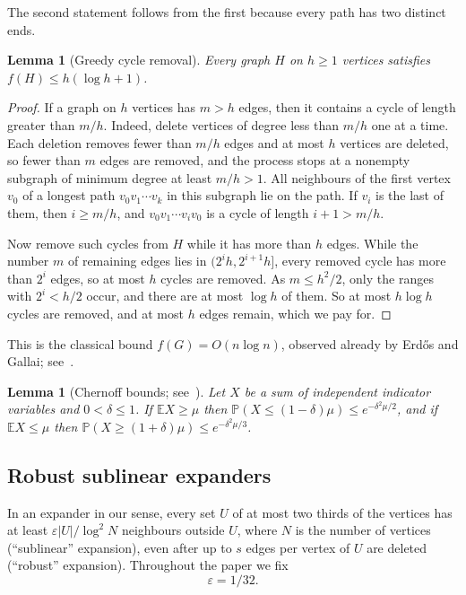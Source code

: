 \documentclass[11pt]{article}
\newtheorem{lemma}[theorem]{Lemma}
\theoremstyle{definition}
\theoremstyle{remark}
\numberwithin{equation}{section}
\numberwithin{figure}{section}
\numberwithin{table}{section}
\newcommand{\eps}{\varepsilon}
\newcommand{\E}{\mathbb{E}}
\renewcommand{\Pr}{\mathbb{P}}
\begin{document}
The second statement follows from the first because every path has two
distinct ends.

\begin{lemma}[Greedy cycle removal]\label{lem:egp}
Every graph $H$ on $h\ge1$ vertices satisfies $f(H)\le h(\log h+1)$.
\end{lemma}

\begin{proof}
If a graph on $h$ vertices has $m>h$ edges, then it contains a cycle of length
greater than $m/h$. Indeed, delete vertices of degree less than $m/h$ one at a
time. Each deletion removes fewer than $m/h$ edges and at most $h$ vertices are
deleted, so fewer than $m$ edges are removed, and the process stops at a
nonempty subgraph of minimum degree at least $m/h>1$. All neighbours of the
first vertex $v_0$ of a longest path $v_0v_1\cdots v_k$ in this subgraph lie on
the path. If $v_i$ is the last of them, then $i\ge m/h$, and
$v_0v_1\cdots v_iv_0$ is a cycle of length $i+1>m/h$.

Now remove such cycles from $H$ while it has more than $h$ edges. While the
number $m$ of remaining edges lies in $(2^ih,2^{i+1}h]$, every removed cycle has
more than $2^i$ edges, so at most $h$ cycles are removed. As $m\le h^2/2$, only
the ranges with $2^i<h/2$ occur, and there are at most $\log h$ of them. So at
most $h\log h$ cycles are removed, and at most $h$ edges remain, which we pay
for.
\end{proof}

This is the classical bound $f(G)=O(n\log n)$, observed already by Erd\H{o}s
and Gallai; see~\cite{CFS,BM}.

\begin{lemma}[Chernoff bounds; see~{\cite[Theorems~2.1 and~2.8]{JLR}}]\label{lem:chernoff}
Let $X$ be a sum of independent indicator variables and $0<\delta\le1$. If
$\E X\ge\mu$ then $\Pr(X\le(1-\delta)\mu)\le e^{-\delta^2\mu/2}$, and if
$\E X\le\mu$ then $\Pr(X\ge(1+\delta)\mu)\le e^{-\delta^2\mu/3}$.
\end{lemma}

\subsection{Robust sublinear expanders}

In an expander in our sense, every set $U$ of at most two thirds of the
vertices has at least $\eps|U|/\log^2N$ neighbours outside $U$, where $N$ is the
number of vertices
(``sublinear'' expansion), even after up to $s$ edges per vertex of $U$ are
deleted (``robust'' expansion). Throughout the paper we fix
\[
\eps=1/32.
\]
\end{document}
